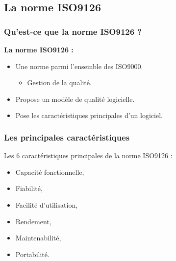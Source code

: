 \documentclass[10pt]{beamer}
\begin{document}
\subsection{La norme ISO9126}
\begin{frame}
\frametitle{Qu'est-ce que la norme ISO9126 ?}

\pause[2] \textbf{La norme ISO9126 :}
\medskip
   \begin{itemize}
	\item<3-> Une norme parmi l'ensemble des ISO9000.
\medskip
		   \begin{itemize}
			\item<4-> Gestion de la qualité.
    		   \end{itemize}
\medskip
	\item<5-> Propose un modèle de qualité logicielle.
\medskip
	\item<6-> Pose les caractéristiques principales d'un logiciel.
    \end{itemize}

\end{frame}

%
\begin{frame}
\frametitle{Les principales caractéristiques}
\pause[2]Les 6 caractéristiques principales de la norme ISO9126 :
	\begin{itemize}
	\item<3->Capacité fonctionnelle,
	\item<4->Fiabilité,
	\item<5->Facilité d'utilisation,
	\item<6->Rendement,
	\item<7->Maintenabilité,
	\item<8->Portabilité.
	\end{itemize}
\end{frame}
\end{document}
